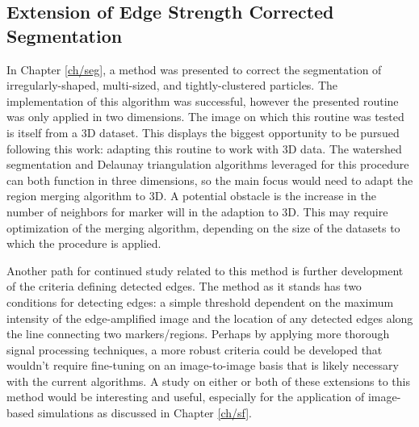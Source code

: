 \subsection{Extension of Edge Strength Corrected Segmentation}
In Chapter \ref{ch/seg}, a method was presented to correct the
segmentation of irregularly-shaped, multi-sized, and tightly-clustered
particles. The implementation of this algorithm was successful,
however the presented routine was only applied in two dimensions.
The image on which this routine was tested is itself from a
3D dataset. This displays the biggest opportunity to be
pursued following this work: adapting this routine to work with
3D data. The watershed segmentation and Delaunay
triangulation algorithms leveraged for this procedure can both function
in three dimensions, so the main focus would need to adapt the region
merging algorithm to 3D. A potential obstacle is the increase in the number
of neighbors for marker will in the adaption to 3D. This may require
optimization of the merging algorithm, depending on the size of the
datasets to which the procedure is applied.

Another path for continued study related to this method is further
development of the criteria defining detected edges.
The method as it stands has two conditions for detecting edges: a simple
threshold dependent on the maximum intensity of the edge-amplified
image and the location of any detected edges along the line connecting
two markers/regions. Perhaps by applying more thorough signal
processing techniques, a more robust criteria could be developed that
wouldn't require fine-tuning on an image-to-image basis that is likely
necessary with the current algorithms. A study on either or both of these
extensions to this method would be interesting and useful, especially for
the application of image-based simulations as discussed in Chapter \ref{ch/sf}.

